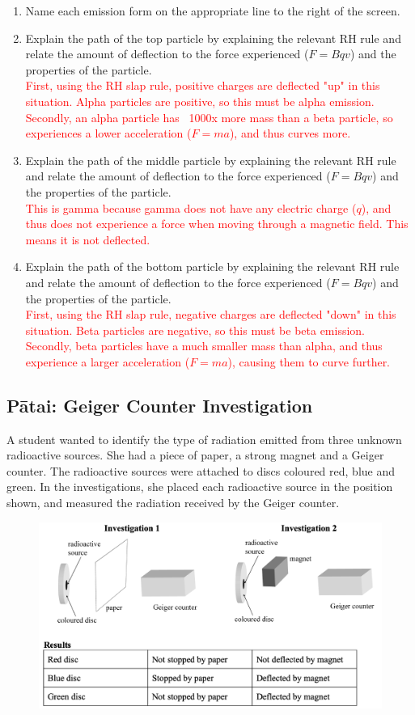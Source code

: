 \documentclass[12pt]{report}
\makeatletter
\DeclareRobustCommand{\StudentVSpace}[2]{%
	\ifthenelse{\boolean{@answer}}
	{\textcolor{red}{\\#1}}
	{\vspace{#2}}
}
\makeatother
\begin{document}
\begin{enumerate}
	\item Name each emission form on the appropriate line to the right of the screen.

	\item Explain the path of the top particle by explaining the relevant RH rule and relate the amount of deflection to the force experienced ($F=Bqv$) and the properties of the particle.
	\StudentVSpace{
		First, using the RH slap rule, positive charges are deflected "up" in this situation. Alpha particles are positive, so this must be alpha emission. Secondly, an alpha particle has ~1000x more mass than a beta particle, so experiences a lower acceleration ($F=ma$), and thus curves more.
	}{3cm}
	
	\item Explain the path of the middle particle by explaining the relevant RH rule and relate the amount of deflection to the force experienced ($F=Bqv$) and the properties of the particle.
	\StudentVSpace{
		This is gamma because gamma does not have any electric charge ($q$), and thus does not experience a force when moving through a magnetic field. This means it is not deflected.
	}{3cm}

	\item Explain the path of the bottom particle by explaining the relevant RH rule and relate the amount of deflection to the force experienced ($F=Bqv$) and the properties of the particle.
	\StudentVSpace{
		First, using the RH slap rule, negative charges are deflected "down" in this situation. Beta particles are negative, so this must be beta emission. Secondly, beta particles have a much smaller mass than alpha, and thus experience a larger acceleration ($F=ma$), causing them to curve further.
	}{3cm}
\end{enumerate}

\newpage
\subsection{Pātai: Geiger Counter Investigation}
A student wanted to identify the type of radiation emitted from three unknown radioactive sources. She had a piece of paper, a strong magnet and a Geiger counter. The radioactive sources were attached to discs coloured red, blue and green. In the investigations, she placed each radioactive source in the position shown, and measured the radiation received by the Geiger counter.

\begin{figure}[ht]
	\centering
	\includegraphics[width=0.8\linewidth]{geiger-investigation.png}
\end{figure}
\end{document}
